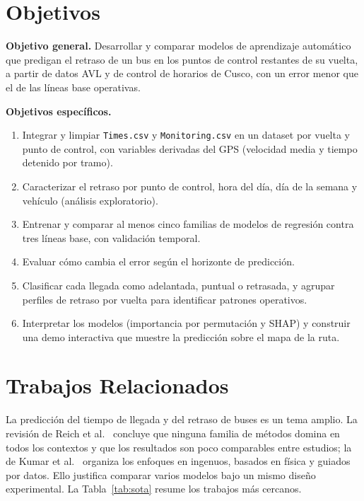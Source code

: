 \documentclass[conference,spanish]{IEEEtran}
\begin{document}
\section{Objetivos}

\textbf{Objetivo general.} Desarrollar y comparar modelos de aprendizaje automático que predigan el retraso de un bus en los puntos de control restantes de su vuelta, a partir de datos AVL y de control de horarios de Cusco, con un error menor que el de las líneas base operativas.

\textbf{Objetivos específicos.}
\begin{enumerate}
    \item Integrar y limpiar \texttt{Times.csv} y \texttt{Monitoring.csv} en un dataset por vuelta y punto de control, con variables derivadas del GPS (velocidad media y tiempo detenido por tramo).
    \item Caracterizar el retraso por punto de control, hora del día, día de la semana y vehículo (análisis exploratorio).
    \item Entrenar y comparar al menos cinco familias de modelos de regresión contra tres líneas base, con validación temporal.
    \item Evaluar cómo cambia el error según el horizonte de predicción.
    \item Clasificar cada llegada como adelantada, puntual o retrasada, y agrupar perfiles de retraso por vuelta para identificar patrones operativos.
    \item Interpretar los modelos (importancia por permutación y SHAP) y construir una demo interactiva que muestre la predicción sobre el mapa de la ruta.
\end{enumerate}

\section{Trabajos Relacionados}

La predicción del tiempo de llegada y del retraso de buses es un tema amplio. La revisión de Reich et al.\ \cite{reich2019} concluye que ninguna familia de métodos domina en todos los contextos y que los resultados son poco comparables entre estudios; la de Kumar et al.\ \cite{kumar2025review} organiza los enfoques en ingenuos, basados en física y guiados por datos. Ello justifica comparar varios modelos bajo un mismo diseño experimental. La Tabla~\ref{tab:sota} resume los trabajos más cercanos.
\end{document}
